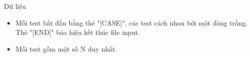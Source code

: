Dữ liệu  
\begin{itemize}
	\item     Mỗi test bắt đầu bằng thẻ "[CASE]", các test cách nhau bởi một dòng trắng. Thẻ "[END]" báo hiệu kết thúc file input.   
	\item     Mỗi test gồm một số N duy nhất.   
\end{itemize}